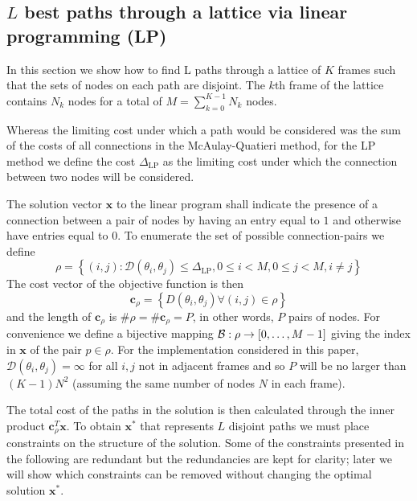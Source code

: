 \documentclass{article}
\newcommand{\cLP}{\boldsymbol{c}_{\rho}}
\newcommand{\BS}[1]{\boldsymbol{#1}}
\begin{document}
\begin{sloppy}
\section{$L$ best paths through a lattice via linear programming (LP)}

In this section we show how to find L paths through a lattice of $K$ frames such
that the sets of nodes on each path are disjoint. The $k$th frame of the lattice
contains $N_{k}$ nodes for a total of $M = \sum_{k=0}^{K-1}N_{k}$ nodes.

Whereas the limiting cost under which a path would be considered was the sum of
the costs of all connections in the McAulay-Quatieri method, for the LP method
we define the cost $\Delta_{\text{LP}}$ as the limiting cost under which the
connection between two nodes will be considered.

The solution vector $\BS{x}$ to the linear program shall indicate the presence of a
connection between a pair of nodes by having an entry equal to $1$ and otherwise
have entries equal to $0$. To enumerate the set of possible connection-pairs we
define
\begin{equation}
    \rho = \left\{ (i,j) : \mathcal{D}(\theta_{i},\theta_{j}) \leq
    \Delta_{\text{LP}} , 0 \leq i < M, 0 \leq j < M, i \neq j \right\}
\end{equation}
The cost vector of the objective function is then 
\begin{equation}
    \cLP = \left\{ D(\theta_{i},\theta_{j}) \forall (i,j) \in
    \rho \right\}
\end{equation}
and the length of $\cLP$ is $\# \rho = \# \cLP = P$, in other words, $P$
pairs of nodes. For convenience we define a bijective mapping ${\mathcal{B} :
\rho \rightarrow [0, \mathellipsis, M-1]}$ giving the index in $\BS{x}$ of the
pair $p \in \rho$. For the implementation considered in this paper,
$\mathcal{D}(\theta_{i},\theta_{j}) = \infty$ for all $i,j$ not in adjacent
frames and so $P$ will be no larger than $(K-1)N^{2}$ (assuming the same
number of nodes $N$ in each frame).

The total cost of the paths in the solution is then calculated through the
inner product $\cLP^{T}\BS{x}$. To obtain $\BS{x}^{\ast}$ that represents $L$
disjoint paths we must place constraints on the structure of the solution. Some
of the constraints presented in the following are redundant but the redundancies
are kept for clarity; later we will show which constraints can be removed
without changing the optimal solution $\BS{x}^{\ast}$.


\end{sloppy}
\end{document}
